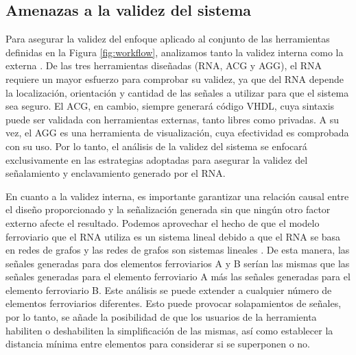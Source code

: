 \subsection{Amenazas a la validez del sistema}
    \label{sec:validacion}
    Para asegurar la validez del enfoque aplicado al conjunto de las herramientas definidas en la Figura \ref{fig:workflow}, analizamos tanto la validez interna como la externa \cite{Paper_139,Paper_121,Paper_185}. De las tres herramientas diseñadas (RNA, ACG y AGG), el RNA requiere un mayor esfuerzo para comprobar su validez, ya que del RNA depende la localización, orientación y cantidad de las señales a utilizar para que el sistema sea seguro. El ACG, en cambio, siempre generará código VHDL, cuya sintaxis puede ser validada con herramientas externas, tanto libres como privadas. A su vez, el AGG es una herramienta de visualización, cuya efectividad es comprobada con su uso. Por lo tanto, el análisis de la validez del sistema se enfocará exclusivamente en las estrategias adoptadas para asegurar la validez del señalamiento y enclavamiento generado por el RNA.    
    
    En cuanto a la validez interna, es importante garantizar una relación causal entre el diseño proporcionado y la señalización generada sin que ningún otro factor externo afecte el resultado. Podemos aprovechar el hecho de que el modelo ferroviario que el RNA utiliza es un sistema lineal debido a que el RNA se basa en redes de grafos \cite{Paper_109,Paper_112,Paper_149,Paper_150,Paper_201} y las redes de grafos son sistemas lineales \cite{Paper_19,Paper_86,Paper_89,Paper_101,Paper_102,Paper_114,Paper_115,Paper_141,Paper_142,Paper_144,Paper_146,Paper_151,Paper_154,Paper_155,Paper_162,Paper_163,Paper_169,Paper_171,Paper_180}. De esta manera, las señales generadas para dos elementos ferroviarios A y B serían las mismas que las señales generadas para el elemento ferroviario A más las señales generadas para el elemento ferroviario B. Este análisis se puede extender a cualquier número de elementos ferroviarios diferentes. Esto puede provocar solapamientos de señales, por lo tanto, se añade la posibilidad de que los usuarios de la herramienta habiliten o deshabiliten la simplificación de las mismas, así como establecer la distancia mínima entre elementos para considerar si se superponen o no.

